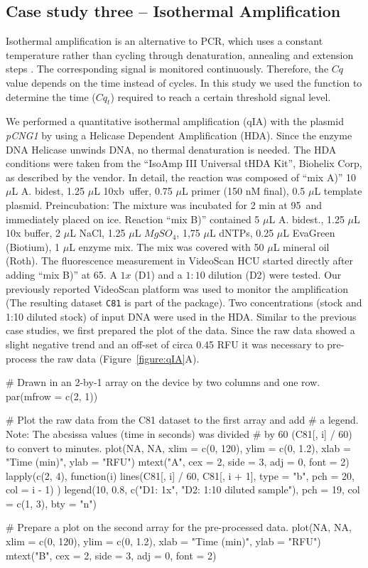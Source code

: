 \subsection{Case study three -- Isothermal Amplification}

Isothermal amplification is an alternative to PCR, which uses a constant 
temperature rather than cycling through denaturation, annealing and extension 
steps \citep{rodiger_nucleic_2014}. The corresponding signal is monitored 
continuously. Therefore, the $Cq$ value depends on the time instead of cycles. 
In this study we used the  function to determine the time 
($Cq_{t}$) required to reach a certain threshold signal level.

We performed a quantitative isothermal amplification (qIA) with the plasmid 
\textit{pCNG1} by using a Helicase Dependent Amplification (HDA). Since the enzyme DNA 
Helicase unwinds DNA, no thermal denaturation is needed. The HDA 
conditions were taken from the ``IsoAmp III Universal tHDA Kit'', Biohelix Corp, 
as described by the vendor. In detail, the reaction was composed of ``mix A)'' 
10 $\mu$L A. bidest, 1.25 $\mu$L 10xb~uffer, 0.75 $\mu$L primer (150 nM final), 
0.5 $\mu$L template plasmid. Preincubation: The mixture was incubated for 2 min 
at 95\textcelsius~and immediately placed on ice. Reaction ``mix B)'' contained 5 
$\mu$L A. bidest., 1.25 $\mu$L 10x buffer, 2 $\mu$L NaCl, 1.25 $\mu$L 
$MgSO_{4}$, 1,75 $\mu$L dNTPs, 0.25 $\mu$L EvaGreen (Biotium), 1 $\mu$L enzyme 
mix. The mix was covered with 50 $\mu$L mineral oil (Roth). The fluorescence 
measurement in VideoScan HCU started directly after adding ``mix B)'' at 
65\textcelsius. A $1x$ (D1) and a $1:10$ dilution (D2) were tested. Our 
previously reported VideoScan platform \citep{rodiger_highly_2013} was used to 
monitor the amplification (The resulting dataset \texttt{C81} is part of the 
 package). Two concentrations (stock and 1:10 diluted stock) of 
input DNA were used in the HDA. Similar to the previous case studies, we first 
prepared the plot of the data. Since the raw 
data showed a slight negative trend and an off-set of circa 0.45 RFU 
it was necessary to pre-process the raw data (Figure~\ref{figure:qIA}A).

\begin{example}
# Drawn in an 2-by-1 array on the device by two columns and one row.
par(mfrow = c(2, 1))

# Plot the raw data from the C81 dataset to the first array and add
# a legend. Note: The abcsissa values (time in seconds) was divided 
# by 60 (C81[, i] / 60) to convert to minutes.
plot(NA, NA, xlim = c(0, 120), ylim = c(0, 1.2), xlab = "Time (min)", ylab = "RFU")
mtext("A", cex = 2, side = 3, adj = 0, font = 2)
lapply(c(2, 4), function(i) {
  lines(C81[, i] / 60, C81[, i + 1], type = "b", pch = 20, col = i - 1)
})
legend(10, 0.8, c("D1: 1x", "D2: 1:10 diluted sample"), pch = 19, col = c(1, 3), 
       bty = "n")

# Prepare a plot on the second array for the pre-processed data.
plot(NA, NA, xlim = c(0, 120), ylim = c(0, 1.2), xlab = "Time (min)", ylab = "RFU")
mtext("B", cex = 2, side = 3, adj = 0, font = 2)
\end{example}

